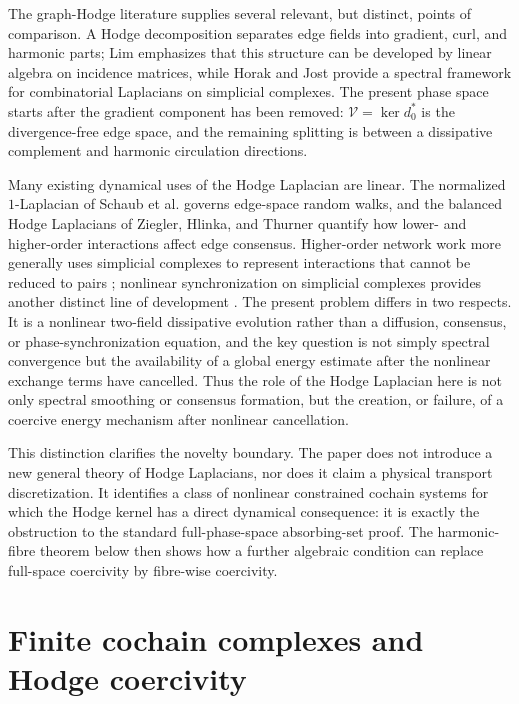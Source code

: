 \documentclass[11pt]{article}
\theoremstyle{remark}
\begin{document}
The graph-Hodge literature supplies several relevant, but distinct, points of comparison. A Hodge decomposition separates edge fields into gradient, curl, and harmonic parts; Lim \cite{Lim2020} emphasizes that this structure can be developed by linear algebra on incidence matrices, while Horak and Jost \cite{HorakJost2013} provide a spectral framework for combinatorial Laplacians on simplicial complexes. The present phase space starts after the gradient component has been removed: $\mathcal V=\ker d_0^*$ is the divergence-free edge space, and the remaining splitting is between a dissipative complement and harmonic circulation directions.

Many existing dynamical uses of the Hodge Laplacian are linear. The normalized $1$-Laplacian of Schaub et al. \cite{SchaubEtAl2020} governs edge-space random walks, and the balanced Hodge Laplacians of Ziegler, Hlinka, and Thurner \cite{ZieglerEtAl2022} quantify how lower- and higher-order interactions affect edge consensus. Higher-order network work more generally uses simplicial complexes to represent interactions that cannot be reduced to pairs \cite{BensonGleichLeskovec2016,BattistonEtAl2021}; nonlinear synchronization on simplicial complexes provides another distinct line of development \cite{MillanTorresBianconi2020}. The present problem differs in two respects. It is a nonlinear two-field dissipative evolution rather than a diffusion, consensus, or phase-synchronization equation, and the key question is not simply spectral convergence but the availability of a global energy estimate after the nonlinear exchange terms have cancelled. Thus the role of the Hodge Laplacian here is not only spectral smoothing or consensus formation, but the creation, or failure, of a coercive energy mechanism after nonlinear cancellation.

This distinction clarifies the novelty boundary. The paper does not introduce a new general theory of Hodge Laplacians, nor does it claim a physical transport discretization. It identifies a class of nonlinear constrained cochain systems for which the Hodge kernel has a direct dynamical consequence: it is exactly the obstruction to the standard full-phase-space absorbing-set proof. The harmonic-fibre theorem below then shows how a further algebraic condition can replace full-space coercivity by fibre-wise coercivity.

\section{Finite cochain complexes and Hodge coercivity}
\end{document}
